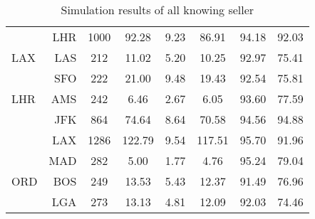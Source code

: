 \begin{table}[h]
\begin{center}
\begin{tabular}{l r c c c c c c}
~    &  LHR  &    1000  &   92.28  &   9.23  &   86.91  &   94.18  &   92.03 \\[.5ex]
LAX  &  LAS  &     212  &   11.02  &   5.20  &   10.25  &   92.97  &   75.41 \\
~    &  SFO  &     222  &   21.00  &   9.48  &   19.43  &   92.54  &   75.81 \\[.5ex]
LHR  &  AMS  &     242  &    6.46  &   2.67  &    6.05  &   93.60  &   77.59 \\
~    &  JFK  &     864  &   74.64  &   8.64  &   70.58  &   94.56  &   94.88 \\
~    &  LAX  &    1286  &  122.79  &   9.54  &  117.51  &   95.70  &   91.96 \\
~    &  MAD  &     282  &    5.00  &   1.77  &    4.76  &   95.24  &   79.04 \\[.5ex]
ORD  &  BOS  &     249  &   13.53  &   5.43  &   12.37  &   91.49  &   76.96 \\
~    &  LGA  &     273  &   13.13  &   4.81  &   12.09  &   92.03  &   74.46 \\
            \bottomrule
        \end{tabular}
        \caption{Simulation results of all knowing seller}
        \label{tbl:resultsAllKnowing}
    \end{center}
\end{table}


